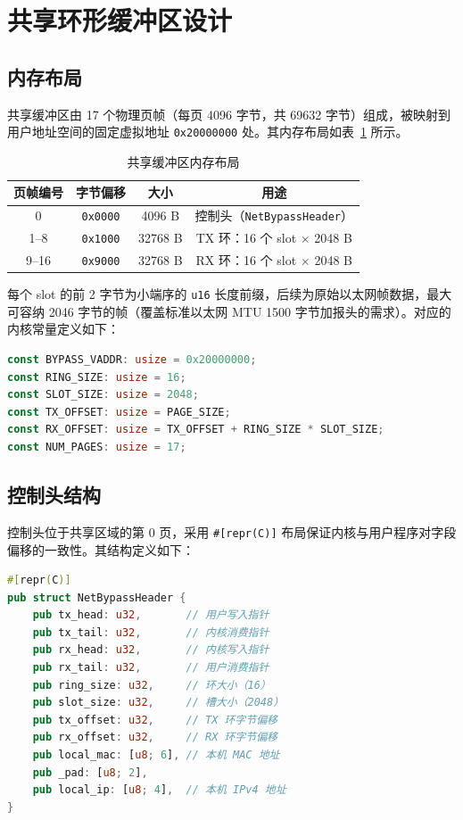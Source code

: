 \section{共享环形缓冲区设计}

\subsection{内存布局}

共享缓冲区由 17 个物理页帧（每页 4096 字节，共 69632 字节）组成，被映射到用户地址空间的固定虚拟地址 \texttt{0x20000000} 处。其内存布局如表~\ref{tab:layout} 所示。

\begin{table}[htbp]
    \centering
    \caption{共享缓冲区内存布局}
    \label{tab:layout}
    \begin{tabular}{cccc}
        \toprule
        页帧编号 & 字节偏移 & 大小 & 用途 \\
        \midrule
        0 & \texttt{0x0000} & 4096 B & 控制头（\texttt{NetBypassHeader}） \\
        1--8 & \texttt{0x1000} & 32768 B & TX 环：16 个 slot $\times$ 2048 B \\
        9--16 & \texttt{0x9000} & 32768 B & RX 环：16 个 slot $\times$ 2048 B \\
        \bottomrule
    \end{tabular}
\end{table}

每个 slot 的前 2 字节为小端序的 \texttt{u16} 长度前缀，后续为原始以太网帧数据，最大可容纳 2046 字节的帧（覆盖标准以太网 MTU 1500 字节加报头的需求）。对应的内核常量定义如下：

\begin{lstlisting}[language=Rust, caption={共享缓冲区常量定义}]
const BYPASS_VADDR: usize = 0x20000000;
const RING_SIZE: usize = 16;
const SLOT_SIZE: usize = 2048;
const TX_OFFSET: usize = PAGE_SIZE;
const RX_OFFSET: usize = TX_OFFSET + RING_SIZE * SLOT_SIZE;
const NUM_PAGES: usize = 17;
\end{lstlisting}

\subsection{控制头结构}

控制头位于共享区域的第 0 页，采用 \texttt{\#[repr(C)]} 布局保证内核与用户程序对字段偏移的一致性。其结构定义如下：

\begin{lstlisting}[language=Rust, caption={控制头结构体定义}]
#[repr(C)]
pub struct NetBypassHeader {
    pub tx_head: u32,       // 用户写入指针
    pub tx_tail: u32,       // 内核消费指针
    pub rx_head: u32,       // 内核写入指针
    pub rx_tail: u32,       // 用户消费指针
    pub ring_size: u32,     // 环大小（16）
    pub slot_size: u32,     // 槽大小（2048）
    pub tx_offset: u32,     // TX 环字节偏移
    pub rx_offset: u32,     // RX 环字节偏移
    pub local_mac: [u8; 6], // 本机 MAC 地址
    pub _pad: [u8; 2],
    pub local_ip: [u8; 4],  // 本机 IPv4 地址
}
\end{lstlisting}

